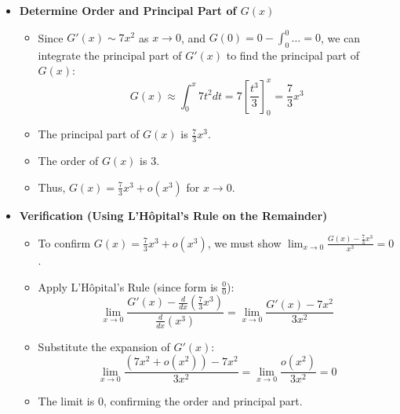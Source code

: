 \begin{cascade}
\begin{itemize}
\begin{itemize}
		      \end{itemize}
		\item \textbf{Determine Order and Principal Part of $G(x)$}
		      \begin{itemize}
			      \item Since $G'(x) \sim 7x^2$ as $x \to 0$, and $G(0) = 0 - \int_0^0 \dots = 0$, we can integrate the principal part of $G'(x)$ to find the principal part of $G(x)$:
			            \[ G(x) \approx \int_0^x 7t^2 dt = 7 \left[ \frac{t^3}{3} \right]_0^x = \frac{7}{3}x^3 \]
			      \item The principal part of $G(x)$ is $\frac{7}{3}x^3$.
			      \item The order of $G(x)$ is 3.
			      \item Thus, $G(x) = \frac{7}{3}x^3 + o(x^3)$ for $x \to 0$.
		      \end{itemize}
		\item \textbf{Verification (Using L'Hôpital's Rule on the Remainder)}
		      \begin{itemize}
			      \item To confirm $G(x) = \frac{7}{3}x^3 + o(x^3)$, we must show $\lim_{x \to 0} \frac{G(x) - \frac{7}{3}x^3}{x^3} = 0$.
			      \item Apply L'Hôpital's Rule (since form is $\frac{0}{0}$):
			            \[ \lim_{x \to 0} \frac{G'(x) - \frac{d}{dx}(\frac{7}{3}x^3)}{\frac{d}{dx}(x^3)} = \lim_{x \to 0} \frac{G'(x) - 7x^2}{3x^2} \]
			      \item Substitute the expansion of $G'(x)$:
			            \[ \lim_{x \to 0} \frac{(7x^2 + o(x^2)) - 7x^2}{3x^2} = \lim_{x \to 0} \frac{o(x^2)}{3x^2} = 0 \]
			      \item The limit is 0, confirming the order and principal part.
		      \end{itemize}
	\end{itemize}
\end{cascade}

